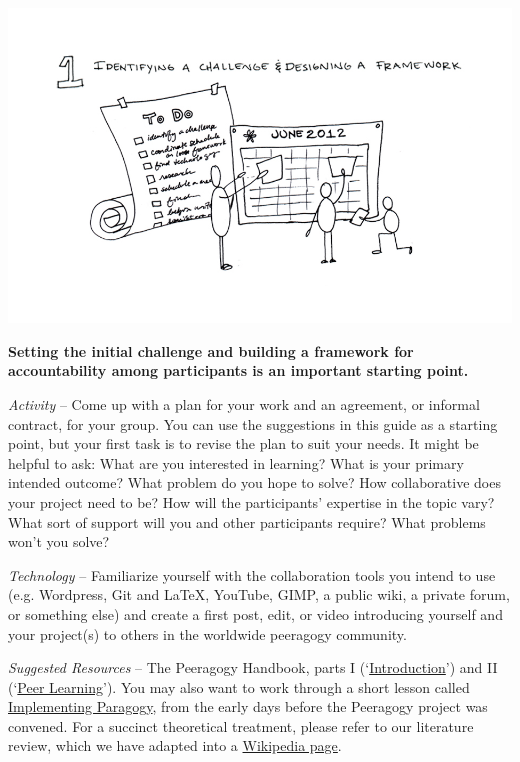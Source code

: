 \begin{center}
\includegraphics{../pictures/OpenBook-2-1.jpg}
\end{center}


\textbf{Setting the initial challenge and building a framework for
accountability among participants is an important starting point.}

\emph{Activity} -- Come up with a plan for your work and an agreement,
or informal contract, for your group. You can use the suggestions in
this guide as a starting point, but your first task is to revise the
plan to suit your needs. It might be helpful to ask: What are you
interested in learning? What is your primary intended outcome? What
problem do you hope to solve? How collaborative does your project need
to be? How will the participants' expertise in the topic vary? What sort
of support will you and other participants require? What problems won't
you solve?

\emph{Technology} -- Familiarize yourself with the collaboration tools
you intend to use (e.g. Wordpress, Git and LaTeX, YouTube, GIMP, a
public wiki, a private forum, or something else) and create a first
post, edit, or video introducing yourself and your project(s) to others
in the worldwide peeragogy community.

\emph{Suggested Resources} -- The Peeragogy Handbook, parts I
(`\href{http://peeragogy.org/}{Introduction}') and II
(`\href{http://peeragogy.org/peer-learning/}{Peer Learning}'). You may
also want to work through a short lesson called
\href{https://en.wikiversity.org/wiki/User:Arided/ImplementingParagogy}{Implementing
Paragogy}, from the early days before the Peeragogy project was
convened. For a succinct theoretical treatment, please refer to our
literature review, which we have adapted into a
\href{http://en.wikipedia.org/wiki/Peer\_learning}{Wikipedia page}.

